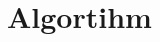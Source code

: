 \section{Algortihm}

\newcommand{\fmt}[1]{\ensuremath{\langle n^{[#1]}, i^{[#1]}, f^{[#1]}\rangle}}
\newcommand{\Abox}[1]{\ensuremath{\mathcal{A}^{[#1]}}}
\newcommand{\Gbox}[1]{\ensuremath{\mathcal{G}^{[#1]}}}
\newcommand{\dbud}[1]{\ensuremath{\delta^{[#1]}}}
\newcommand{\Nfp}[1]{\ensuremath{\widehat{N}^{[#1]}_{\mathit{fp}}}}
\algrenewcommand{}
\algrenewcommand{}

